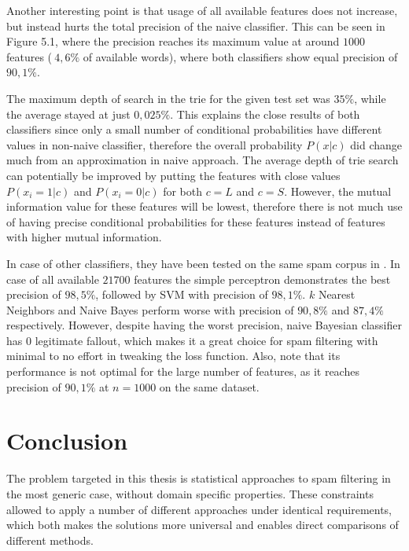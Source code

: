 \documentclass[12pt]{report}
\begin{document}
Another interesting point is that usage of all available features does not increase, but instead hurts the total precision of the naive classifier. This can be seen in Figure 5.1, where the precision reaches its maximum value at around $1000$ features ($~4,6\%$ of available words), where both classifiers show equal precision of $90,1\%$.

The maximum depth of search in the trie for the given test set was $35\%$, while the average stayed at just $0,025\%$. This explains the close results of both classifiers since only a small number of conditional probabilities have different values in non-naive classifier, therefore the overall probability $P(x | c)$ did change much from an approximation in naive approach. The average depth of trie search can potentially be improved by putting the features with close values $P(x_i = 1 | c)$ and $P(x_i = 0 | c)$ for both $c = L$ and $c = S$. However, the mutual information value for these features will be lowest, therefore there is not much use of having precise conditional probabilities for these features instead of features with higher mutual information.

In case of other classifiers, they have been tested on the same spam corpus in \cite{Tretyakov}. In case of all available $21700$ features the simple perceptron demonstrates the best precision of $98,5\%$, followed by SVM with precision of $98,1\%$. $k$ Nearest Neighbors and Naive Bayes perform worse with precision of $90,8\%$ and $87,4\%$ respectively. However, despite having the worst precision, naive Bayesian classifier has $0$ legitimate fallout, which makes it a great choice for spam filtering with minimal to no effort in tweaking the loss function. Also, note that its performance is not optimal for the large number of features, as it reaches precision of $90,1\%$ at $n = 1000$ on the same dataset.

\newpage


\chapter*{Conclusion}

The problem targeted in this thesis is statistical approaches to spam filtering in the most generic case, without domain specific properties. These constraints allowed to apply a number of different approaches under identical requirements, which both makes the solutions more universal and enables direct comparisons of different methods.
\end{document}
